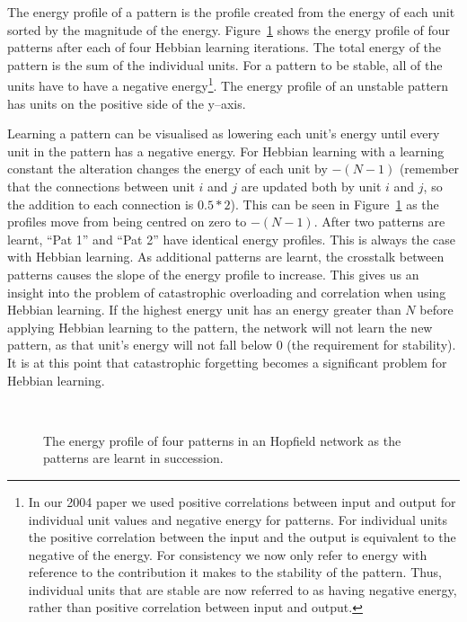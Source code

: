 The energy profile of a pattern is the profile created from the energy of each unit sorted by the magnitude of the energy.  Figure~\ref{fig:HebbianEnergyLearning} shows the energy profile of four patterns after each of four Hebbian learning iterations. The total energy of the pattern is the sum of the individual units.  For a pattern to be stable, all of the units have to have a negative energy\footnote{In our 2004 paper \citep{Robins2004} we used positive correlations between input and output for individual unit values and negative energy for patterns.  For individual units the positive correlation between the input and the output is equivalent to the negative of the energy.  For consistency we now only refer to energy with reference to the contribution it makes to the stability of the pattern.  Thus, individual units that are stable are now referred to as having negative energy, rather than positive correlation between input and output.}.  The energy profile of an unstable pattern has units on the positive side of the y--axis.  

Learning a pattern can be visualised as lowering each unit's energy until every unit in the pattern has a negative energy. For Hebbian learning with a learning constant  the alteration changes the energy of each unit by $-(N-1)$ (remember that the connections between unit $i$ and $j$ are updated both by unit $i$ and $j$, so the addition to each connection is $0.5*2$).  This can be seen in Figure~\ref{fig:HebbianEnergyLearning} as the profiles move from being centred on zero to $-(N-1)$. After two patterns are learnt, ``Pat 1'' and ``Pat 2'' have identical energy profiles. This is always the case with Hebbian learning. As additional patterns are learnt, the crosstalk between patterns causes the slope of the energy profile to increase. This gives us an insight into the problem of catastrophic overloading and correlation when using Hebbian learning.  If the highest energy unit has an energy greater than \(N\) before applying Hebbian learning to the pattern, the network will not learn the new pattern, as that unit's energy will not fall below 0 (the requirement for stability).  It is at this point that catastrophic forgetting becomes a significant problem for Hebbian learning. 

\begin{figure}[tb]
	\scalebox{0.60}{}
	\scalebox{0.60}{}
	\\
	\scalebox{0.60}{}
	\scalebox{0.60}{}
	\caption{The energy profile of four patterns in an  Hopfield network as the patterns are learnt in succession. }
	\label{fig:HebbianEnergyLearning}
\end{figure}

